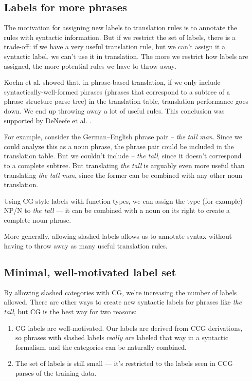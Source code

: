\documentclass{article}
\begin{document}
\subsection{Labels for more phrases}

The motivation for assigning new labels to translation rules is to annotate the rules with syntactic information. But if we restrict the set of labels, there is a trade-off: if we have a very useful translation rule, but we can't assign it a syntactic label, we can't use it in translation. The more we restrict how labels are assigned, the more potential rules we have to throw away.

Koehn et al.  showed that, in phrase-based translation, if we only include syntactically-well-formed phrases (phrases that correspond to a subtree of a phrase structure parse tree) in the translation table, translation performance goes down. We end up throwing away a lot of useful rules. This conclusion was supported by DeNeefe et al. .

For example, consider the German--English phrase pair {\em  -- the tall man}. Since we could analyze this as a noun phrase, the phrase pair could be included in the translation table. But we couldn't include {\em -- the tall}, since it doesn't correspond to a complete subtree. But translating {\em the tall} is arguably even more useful than translating {\em the tall man}, since the former can be combined with any other noun translation.

Using CG-style labels with function types, we can assign the type (for example) NP/N to {\em the tall} --- it can be combined with a noun on its right to create a complete noun phrase.

More generally, allowing slashed labels allows us to annotate syntax without having to throw away as many useful translation rules.

\subsection{Minimal, well-motivated label set}

By allowing slashed categories with CG, we're increasing the number of labels allowed. There are other ways to create new syntactic labels for phrases like {\em the tall}, but CG is the best way for two reasons:
\begin{enumerate}
\item CG labels are well-motivated. Our labels are derived from CCG derivations, so phrases with slashed labels {\em really are} labeled that way in a syntactic formalism, and the categories can be naturally combined.
\item The set of labels is still small --- it's restricted to the labels seen in CCG parses of the training data.
\end{enumerate}
\end{document}
